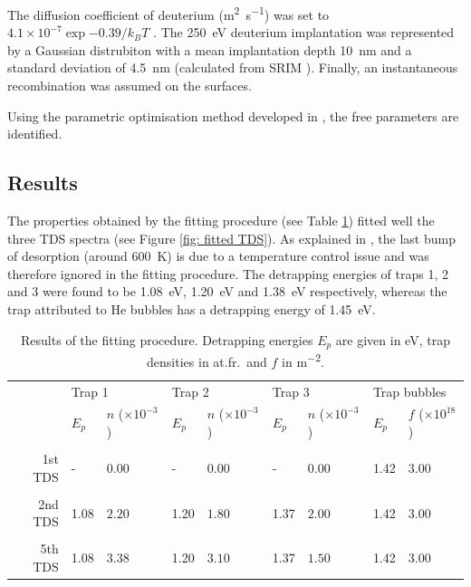 The diffusion coefficient of deuterium (\si{m^2.s^{-1}}) was set to $4.1\times 10 ^{-7} \exp{-0.39/k_B T}$ .
The \SI{250}{eV} deuterium implantation was represented by a Gaussian distrubiton with a mean implantation depth \SI{10}{nm} and a standard deviation of \SI{4.5}{nm} (calculated from SRIM ).
Finally, an instantaneous recombination was assumed on the surfaces.

Using the parametric optimisation method developed in , the free parameters are identified.

\subsection{Results}

The properties obtained by the fitting procedure (see Table \ref{tab: trap properties results}) fitted well the three TDS spectra (see Figure \ref{fig: fitted TDS}).
As explained in \cite{ialovega_hydrogen_2020}, the last bump of desorption (around \SI{600}{K}) is due to a temperature control issue and was therefore ignored in the fitting procedure.
The detrapping energies of traps 1, 2 and 3 were found to be \SI{1.08}{eV}, \SI{1.20}{eV} and \SI{1.38}{eV} respectively, whereas the trap attributed to He bubbles has a detrapping energy of \SI{1.45}{eV}.


\begin{table}[!h]
    \caption{Results of the fitting procedure. Detrapping energies $E_p$ are given in \si{eV}, trap densities in \si{at.fr.} and $f$ in \si{m^{-2}}.}
    \begin{tabular}{r l l l l l l l l}
    \\
    &\multicolumn{2}{l}{Trap 1}  & \multicolumn{2}{l}{Trap 2} & \multicolumn{2}{l}{Trap 3} &\multicolumn{2}{l}{Trap bubbles} \\
     & $E_p$ & $n$ ($\times 10 ^{-3}$) & $E_p$ & $n$ ($\times 10 ^{-3}$) & $E_p$ & $n$ ($\times 10 ^{-3}$) & $E_p$ & $f$ ($\times 10 ^{18}$) \\
    \\
    1st TDS & - & 0.00 & - & 0.00 & - & 0.00 & 1.42 & $3.00$ \\
    \\
    2nd TDS & 1.08 & $2.20$ & 1.20 & $1.80$ & 1.37 & $2.00$ & 1.42 & $3.00$ \\
    \\
    5th TDS & 1.08 & $3.38$ & 1.20 & $3.10$ & 1.37 & $1.50$ & 1.42 & $3.00$ \\
    \end{tabular}
    \label{tab: trap properties results}
\end{table}

